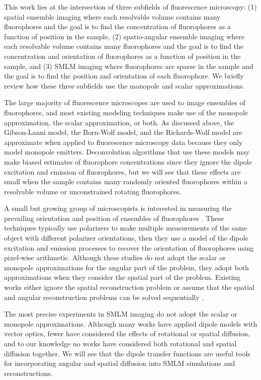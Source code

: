 \documentclass[]{osa-article}
\begin{document}
This work lies at the intersection of three subfields of fluorescence
microscopy: (1) spatial ensemble imaging where each resolvable volume contains
many fluorophores and the goal is to find the concentration of fluorophores as a
function of position in the sample, (2) spatio-angular ensemble imaging where
each resolvable volume contains many fluorophores and the goal is to find the
concentration and orientation of fluorophores as a function of position in the
sample, and (3) SMLM imaging where fluorophores are sparse in the sample and the
goal is to find the position and orientation of each fluorophore. We briefly
review how these three subfields use the monopole and scalar approximations.

The large majority of fluorescence microscopes are used to image ensembles of
fluorophores, and most existing modeling techniques make use of the monopole
approximation, the scalar approximation, or both. As discussed above, the
Gibson-Lanni model, the Born-Wolf model, and the Richards-Wolf model are
approximate when applied to fluorescence microscopy data because they only model
monopole emitters. Deconvolution algorithms that use these models may make
biased estimates of fluorophore concentrations since they ignore the dipole
excitation and emission of fluorophores, but we will see that these effects are
small when the sample contains many randomly oriented fluorophores within a
resolvable volume or unconstrained rotating fluorophores.

A small but growing group of microscopists is interested in measuring the
prevailing orientation and position of ensembles of fluorophores
\cite{vrabioiu2006, mattheyses2010, mehta2016, mcquilken2017, zhanghao2017}.
These techniques typically use polarizers to make multiple measurements of the
same object with different polarizer orientations, then they use a model of the
dipole excitation and emission processes \cite{fourkas2001} to recover the
orientation of fluorophores using pixel-wise arithmetic. Although these studies
do not adopt the scalar or monopole approximations for the angular part of the
problem, they adopt both approximations when they consider the spatial part of
the problem. Existing works either ignore the spatial reconstruction problem
\cite{vrabioiu2006, mattheyses2010, mehta2016, mcquilken2017} or assume that the
spatial and angular reconstruction problems can be solved sequentially
\cite{zhanghao2017}.

The most precise experiments in SMLM imaging do not adopt the scalar or monopole
approximations. Although many works have applied dipole models with vector
optics, fewer have considered the effects of rotational or spatial diffusion,
and to our knowledge no works have considered both rotational and spatial
diffusion together. We will see that the dipole transfer functions are useful
tools for incorporating angular and spatial diffusion into SMLM simulations and
reconstructions.
\end{document}
